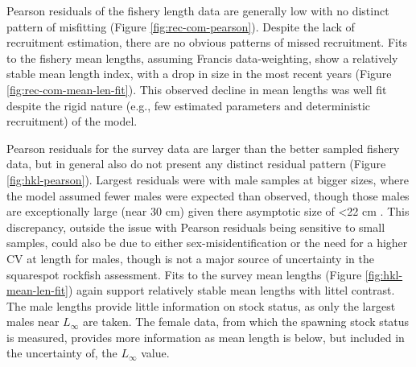 \documentclass[11pt,
  english,
  a4paper,
]{article}
\begin{document}
\leavevmode\tagmcend\tagstructend\par


Pearson residuals of the fishery length data are generally low with no distinct pattern of misfitting (Figure \ref{fig:rec-com-pearson}). Despite the lack of recruitment estimation, there are no obvious patterns of missed recruitment. Fits to the fishery mean lengths, assuming Francis data-weighting, show a relatively stable mean length index, with a drop in size in the most recent years (Figure \ref{fig:rec-com-mean-len-fit}). This observed decline in mean lengths was well fit despite the rigid nature (e.g., few estimated parameters and deterministic recruitment) of the model.

\leavevmode\tagmcend\tagstructend\par


Pearson residuals for the survey data are larger than the better sampled fishery data, but in general also do not present any distinct residual pattern (Figure \ref{fig:hkl-pearson}). Largest residuals were with male samples at bigger sizes, where the model assumed fewer males were expected than observed, though those males are exceptionally large (near 30 cm) given there asymptotic size of \textless22 cm . This discrepancy, outside the issue with Pearson residuals being sensitive to small samples, could also be due to either sex-misidentification or the need for a higher CV at length for males, though is not a major source of uncertainty in the squarespot rockfish assessment. Fits to the survey mean lengths (Figure \ref{fig:hkl-mean-len-fit}) again support relatively stable mean lengths with littel contrast. The male lengths provide little information on stock status, as only the largest males near {\(L_{\infty}\)\leavevmode\tagmcend\tagstructend} are taken. The female data, from which the spawning stock status is measured, provides more information as mean length is below, but included in the uncertainty of, the {\(L_{\infty}\)\leavevmode\tagmcend\tagstructend} value.

\leavevmode\tagmcend\tagstructend\par

\end{document}
